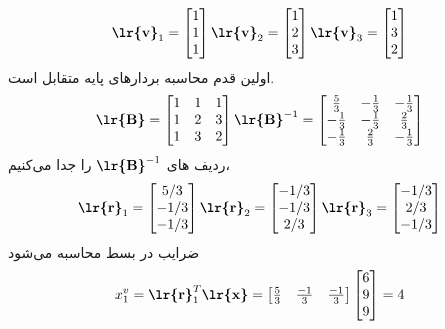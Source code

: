 \documentclass[a4paper,12pt]{report}
\begin{document}
     	 $$
     	 \textbf{\lr{v}}_1=
     	 \begin{bmatrix}
     	 	1 \\ 1 \\ 1
     	 \end{bmatrix}
     	 \textbf{\lr{v}}_2=
     	 \begin{bmatrix}
     	 	1 \\ 2 \\ 3
     	 \end{bmatrix}
     	 \textbf{\lr{v}}_3=
     	 \begin{bmatrix}
     	 	1 \\ 3 \\ 2
     	 \end{bmatrix}
     	 $$
     	 اولین قدم محاسبه بردارهای پایه متقابل است.
     	 $$
     	 \textbf{\lr{B}}=
     	 \begin{bmatrix}
     	 	1 & 1 & 1 \\
     	 	1 & 2 & 3 \\
     	 	1 & 3 & 2
     	 \end{bmatrix}
         \textbf{\lr{B}}^{-1}=
      	 \begin{bmatrix}
      	 	\frac53 & -\frac13 & -\frac13 \\
      	 	-\frac13 & -\frac13 & \frac23 \\
      	 	-\frac13 & \frac23 & -\frac13
      	 \end{bmatrix}
     	 $$
     	 ردیف های 
     	 $ \textbf{\lr{B}}^{-1} $
     	 را جدا می‌کنیم،
     	 $$
     	 \textbf{\lr{r}}_1=
     	 \begin{bmatrix}
     	 	5/3 \\ -1/3 \\ -1/3
     	 \end{bmatrix}
      	 \textbf{\lr{r}}_2=
      	 \begin{bmatrix}
      	 	-1/3 \\ -1/3 \\ 2/3
      	 \end{bmatrix}
       	 \textbf{\lr{r}}_3=
       	 \begin{bmatrix}
       	 	-1/3 \\ 2/3 \\ -1/3
       	 \end{bmatrix}
     	 $$
     	 ضرایب در بسط محاسبه می‌شود
     	 $$
     	 x_1^v=\textbf{\lr{r}}_1^T\textbf{\lr{x}}=
     	 \begin{bmatrix}
     	 	\frac53 & \frac{-1}3 & \frac{-1}3
     	 \end{bmatrix}
      	 \begin{bmatrix}
      	 	6 \\ 9 \\ 9
      	 \end{bmatrix}
       	 =4
     	 $$
\end{document}

